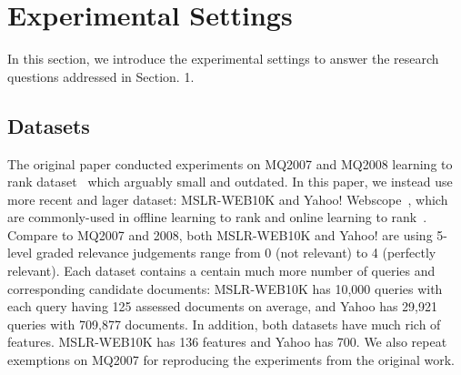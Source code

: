 \section{Experimental Settings}

In this section, we introduce the experimental settings to answer the research questions addressed in Section. 1.

\subsection{Datasets}
The original paper conducted experiments on MQ2007 and MQ2008 learning to rank dataset~\cite{DBLP:journals/corr/QinL13} which arguably small and outdated. In this paper, we instead use more recent and lager dataset: MSLR-WEB10K\cite{DBLP:journals/corr/QinL13} and Yahoo! Webscope~\cite{DBLP:journals/jmlr/ChapelleC11}, which are commonly-used in offline learning to rank and online learning to rank~\cite{zhuang2020counterfactual,DBLP:conf/wsdm/HofmannSWR13,jagerman2019model,oosterhuis2018differentiable}. Compare to MQ2007 and 2008, both MSLR-WEB10K and Yahoo! are using 5-level graded relevance judgements range from 0 (not relevant) to 4 (perfectly relevant).
Each dataset contains a centain much more number of queries and corresponding candidate documents: MSLR-WEB10K has 10,000 queries with each query having 125 assessed documents on average, and Yahoo has 29,921 queries with 709,877 documents. In addition, both datasets have much rich of features.  MSLR-WEB10K has 136 features and Yahoo has 700. We also repeat exemptions on MQ2007 for reproducing the experiments from the original work.




